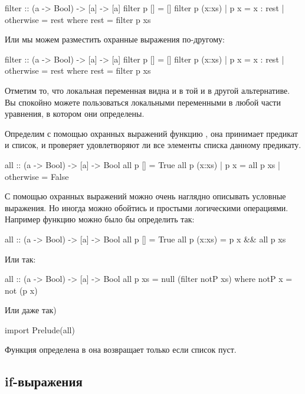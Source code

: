 \begin{code}
filter :: (a -> Bool) -> [a] -> [a]
filter  p  []       = []
filter  p  (x:xs)   
    | p x           = x : rest
    | otherwise     = rest
    where rest = filter p xs
\end{code}

Или мы можем разместить охранные выражения по-другому:

\begin{code}
filter :: (a -> Bool) -> [a] -> [a]
filter  p  []                   = []
filter  p  (x:xs)   | p x       = x : rest
                    | otherwise = rest
    where rest = filter p xs
\end{code}

Отметим то, что локальная переменная  видна и в той 
и в другой альтернативе. Вы спокойно можете пользоваться 
локальными переменными в любой части уравнения, в котором
они определены. 

Определим с помощью охранных выражений функцию ,
она принимает предикат и список, и проверяет удовлетворяют
ли все элементы списка данному предикату.

\begin{code}
all :: (a -> Bool) -> [a] -> Bool
all p []        = True
all p (x:xs)    
    | p x       = all p xs
    | otherwise = False
\end{code}

С помощью охранных выражений можно очень наглядно
описывать условные выражения. Но иногда можно обойтись
и простыми логическими операциями. Например функцию
 можно было бы определить так:

\begin{code}
all :: (a -> Bool) -> [a] -> Bool
all  p  []        = True
all  p  (x:xs)    = p x && all p xs
\end{code}

Или так:

\begin{code}
all :: (a -> Bool) -> [a] -> Bool
all  p  xs = null (filter notP xs)
    where notP x = not (p x)
\end{code}

Или даже так)


\begin{code}
import Prelude(all)
\end{code}

Функция  определена в  она возвращает
 только если список пуст. 

\subsection{if-выражения}

